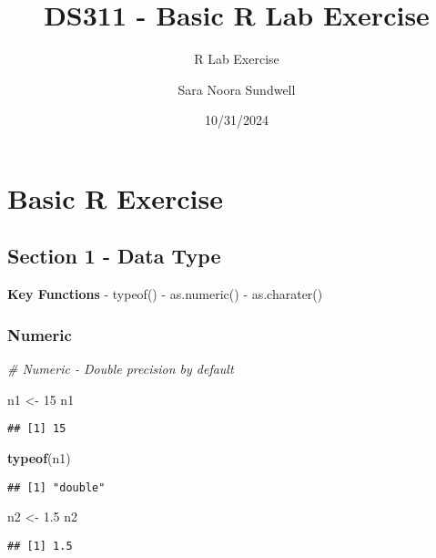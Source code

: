 \documentclass[
]{article}
\title{DS311 - Basic R Lab Exercise}
\subtitle{R Lab Exercise}
\author{Sara Noora Sundwell}
\date{10/31/2024}
\newenvironment{Shaded}{\begin{snugshade}}{\end{snugshade}}
\newcommand{\CommentTok}[1]{\textcolor[rgb]{0.56,0.35,0.01}{\textit{#1}}}
\newcommand{\DecValTok}[1]{\textcolor[rgb]{0.00,0.00,0.81}{#1}}
\newcommand{\FloatTok}[1]{\textcolor[rgb]{0.00,0.00,0.81}{#1}}
\newcommand{\FunctionTok}[1]{\textcolor[rgb]{0.13,0.29,0.53}{\textbf{#1}}}
\newcommand{\NormalTok}[1]{#1}
\newcommand{\OtherTok}[1]{\textcolor[rgb]{0.56,0.35,0.01}{#1}}
\begin{document}
\maketitle

\section{Basic R Exercise}\label{basic-r-exercise}

\subsection{Section 1 - Data Type}\label{section-1---data-type}

\textbf{Key Functions} - typeof() - as.numeric() - as.charater()

\subsubsection{Numeric}\label{numeric}

\begin{Shaded}
\begin{Highlighting}[]
\CommentTok{\# Numeric {-} Double precision by default}

\NormalTok{n1 }\OtherTok{\textless{}{-}} \DecValTok{15}  
\NormalTok{n1}
\end{Highlighting}
\end{Shaded}

\begin{verbatim}
## [1] 15
\end{verbatim}

\begin{Shaded}
\begin{Highlighting}[]
\FunctionTok{typeof}\NormalTok{(n1)}
\end{Highlighting}
\end{Shaded}

\begin{verbatim}
## [1] "double"
\end{verbatim}

\begin{Shaded}
\begin{Highlighting}[]
\NormalTok{n2 }\OtherTok{\textless{}{-}} \FloatTok{1.5}
\NormalTok{n2}
\end{Highlighting}
\end{Shaded}

\begin{verbatim}
## [1] 1.5
\end{verbatim}
\end{document}
